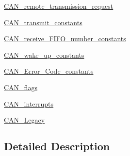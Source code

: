 \begin{DoxyCompactItemize}
\item 
\hyperlink{group___c_a_n__remote__transmission__request}{C\+A\+N\+\_\+remote\+\_\+transmission\+\_\+request}
\item 
\hyperlink{group___c_a_n__transmit__constants}{C\+A\+N\+\_\+transmit\+\_\+constants}
\item 
\hyperlink{group___c_a_n__receive___f_i_f_o__number__constants}{C\+A\+N\+\_\+receive\+\_\+\+F\+I\+F\+O\+\_\+number\+\_\+constants}
\item 
\hyperlink{group___c_a_n__wake__up__constants}{C\+A\+N\+\_\+wake\+\_\+up\+\_\+constants}
\item 
\hyperlink{group___c_a_n___error___code__constants}{C\+A\+N\+\_\+\+Error\+\_\+\+Code\+\_\+constants}
\item 
\hyperlink{group___c_a_n__flags}{C\+A\+N\+\_\+flags}
\item 
\hyperlink{group___c_a_n__interrupts}{C\+A\+N\+\_\+interrupts}
\item 
\hyperlink{group___c_a_n___legacy}{C\+A\+N\+\_\+\+Legacy}
\end{DoxyCompactItemize}


\subsection{Detailed Description}
